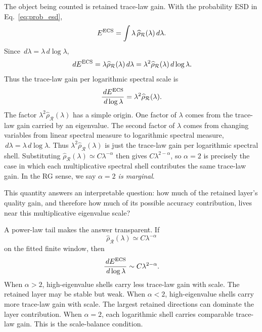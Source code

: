 \documentclass[10pt,twocolumn]{article}
\newcommand{\dd}{\,d}
\newcommand{\Rell}{\mathcal R}
\newcommand{\rhohat}{\widehat\rho}
\newif\ifUseTildeECSNotation
\newcommand{\Ered}{\ifUseTildeECSNotation \widetilde E\else E^{\rm ECS}\fi}
\begin{document}
The object being counted is retained trace-law gain. With the probability ESD in Eq.~\eqref{eq:prob_esd},
\begin{equation}
\Ered=\int\lambda\,\rhohat_{\Rell}(\lambda)\dd\lambda.
\label{eq:E_continuum}
\end{equation}
Since $\dd\lambda=\lambda\dd\log\lambda$,
\begin{equation}
\dd\Ered=\lambda\rhohat_{\Rell}(\lambda)\dd\lambda
=\lambda^2\rhohat_{\Rell}(\lambda)\dd\log\lambda.
\label{eq:shell_dE}
\end{equation}
Thus the trace-law gain per logarithmic spectral scale is
\begin{equation}
\frac{\dd\Ered}{\dd\log\lambda}=\lambda^2\rhohat_{\Rell}(\lambda).
\label{eq:shellenergy}
\end{equation}
The factor $\lambda^2\rhohat_{\Rell}(\lambda)$ has a simple origin. One factor of $\lambda$ comes from the trace-law gain carried by an eigenvalue. The second factor of $\lambda$ comes from changing variables from linear spectral measure to logarithmic spectral measure, $\dd\lambda=\lambda\dd\log\lambda$. Thus $\lambda^2\rhohat_{\Rell}(\lambda)$ is just the trace-law gain per logarithmic spectral shell. Substituting $\rhohat_{\Rell}(\lambda)\simeq C\lambda^{-\alpha}$ then gives $C\lambda^{2-\alpha}$, so $\alpha=2$ is precisely the case in which each multiplicative spectral shell contributes the same trace-law gain.
In the RG sense, we say \emph{$\alpha=2$ is marginal}.

This quantity answers an interpretable question: how much of the retained layer's quality gain, and therefore how much of its possible accuracy contribution, lives near this multiplicative eigenvalue scale?

A power-law tail makes the answer transparent. If
\begin{equation}
\rhohat_{\Rell}(\lambda)\simeq C\lambda^{-\alpha}
\end{equation}
on the fitted finite window, then
\begin{equation}
\frac{\dd\Ered}{\dd\log\lambda}
\sim C\lambda^{2-\alpha}.
\label{eq:shellpower}
\end{equation}
When $\alpha>2$, high-eigenvalue shells carry less trace-law gain with scale. The retained layer may be stable but weak. When $\alpha<2$, high-eigenvalue shells carry more trace-law gain with scale. The largest retained directions can dominate the layer contribution. When $\alpha=2$, each logarithmic shell carries comparable trace-law gain. This is the scale-balance condition.
\end{document}
